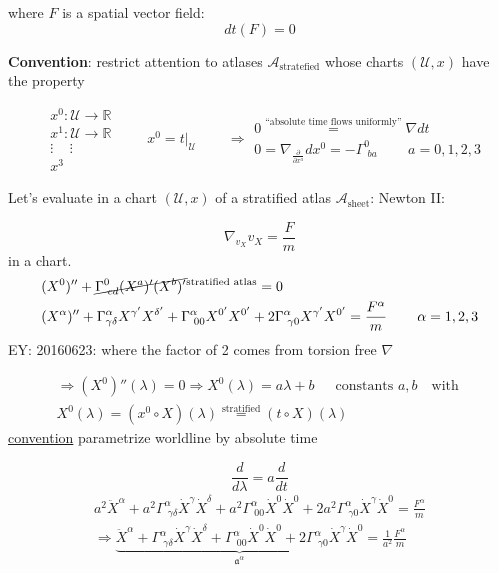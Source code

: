 	
	where $F$ is a spatial vector field:
	\[
	dt(F) = 0 
	\]
	
	\textbf{Convention}: restrict attention to atlases $\mathcal{A}_{\text{stratefied}}$ whose charts $(\mathcal{U}, x)$ have the property
	
	\[
	\begin{aligned}
	& x^0:\mathcal{U} \to \mathbb{R} \\ 
	& x^1: \mathcal{U} \to \mathbb{R} \\ 
	& \vdots \quad \, \vdots \\ 
	& x^3
	\end{aligned}
	\quad \quad \, 
	x^0 = \left. t \right|_{\mathcal{U}}  \quad\quad \, \Longrightarrow \begin{gathered} 0 \overset{\text{``absolute time flows uniformly''} }{=} \nabla dt \\
	0 = \nabla_{\frac{ \partial }{ \partial x^a} } dx^0 = - \Gamma_{ \, \, ba }^0 \quad \quad \, a = 0,1,2,3
	\end{gathered}
	\]
	
	Let's evaluate in a chart $(\mathcal{U},x)$ of a stratified atlas $\mathcal{A}_{\text{sheet}}$: Newton II:
	
	\[
	\nabla_{v_X} v_X = \frac{F}{m}
	\]
	in a chart.
	\[
	\begin{aligned}
	& (X^0)'' + \cancel{ \Gamma^0_{ \, \, cd } (X^a)' (X^b)' }^{ \text{stratified atlas}} = 0  \\
	& (X^{\alpha})'' + \Gamma^{\alpha}_{\gamma \delta} X^{\gamma'} X^{\delta'} + \Gamma^{\alpha}_{ \, \, 00} X^{0'} X^{0'} + 2\Gamma^{\alpha}_{ \, \, \gamma 0} X^{\gamma'} X^{0'} = \frac{F^{\alpha}}{m} \quad \quad \, \alpha = 1,2,3
	\end{aligned}
	\]
	EY: 20160623: where the factor of 2 comes from torsion free $\nabla$
	
	\[
	\begin{gathered}
	\Longrightarrow (X^0)''(\lambda) = 0 \Longrightarrow X^0(\lambda) = a\lambda + b \quad \, \text{ constants $a,b$ } \text{ with  }  \\
	X^0(\lambda) = (x^0 \circ X)(\lambda) \overset{\text{stratified}}{=} (t\circ X)(\lambda)
	\end{gathered}
	\]
	\underline{convention} parametrize worldline by absolute time
	
	\[
	\frac{d}{d\lambda} = a \frac{d}{dt}
	\]
	\[
	\begin{gathered}
	a^2 \ddot{X}^{\alpha} + a^2 \Gamma^{\alpha}_{ \, \, \gamma \delta} \dot{X}^{\gamma} \dot{X}^{\delta} + a^2 \Gamma^{\alpha}_{ \, \, 00 } \dot{X}^0 \dot{X}^0 + 2a^2\Gamma^{\alpha}_{ \, \,\gamma 0} \dot{X}^{\gamma} \dot{X}^{0} =  \frac{ F^{\alpha}}{ m} \\
	\Longrightarrow  \underbrace{ \ddot{X}^{\alpha} +  \Gamma^{\alpha}_{ \, \, \gamma \delta} \dot{X}^{\gamma} \dot{X}^{\delta} +  \Gamma^{\alpha}_{ \, \, 00 } \dot{X}^0 \dot{X}^0 + 2\Gamma^{\alpha}_{ \, \,\gamma 0} \dot{X}^{\gamma} \dot{X}^{0} }_{\mathfrak{a}^{\alpha} } = \frac{1}{a^2} \frac{ F^{\alpha}}{ m} 
	\end{gathered}
	\]
	
